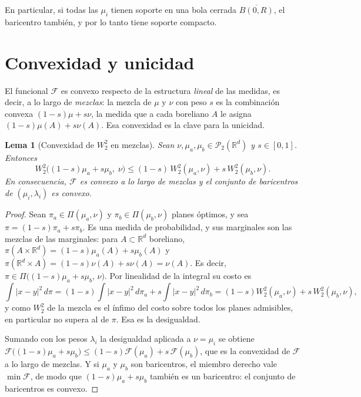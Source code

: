 \documentclass[12pt, a4paper]{amsbook}
\newcommand{\R}{{\mathbb R}}
\newtheorem{lema}[teo]{Lema}
\theoremstyle{remark}
\theoremstyle{definition}
\numberwithin{section}{chapter}
\numberwithin{subsection}{section}
\numberwithin{equation}{section}
\numberwithin{figure}{chapter}
\begin{document}
En particular, si todas las $\mu_i$ tienen soporte en una bola cerrada
$\overline{B(0,R)}$, el baricentro también, y por lo tanto tiene soporte
compacto.

\section{Convexidad y unicidad}\label{sec.bar.unicidad}

El funcional $\mathcal F$ es convexo respecto de la estructura \emph{lineal}
de las medidas, es decir, a lo largo de \emph{mezclas}: la mezcla de $\mu$ y
$\nu$ con peso $s$ es la combinación convexa $(1-s)\mu+s\nu$, la medida que a
cada boreliano $A$ le asigna $(1-s)\mu(A)+s\nu(A)$. Esa convexidad es la
clave para la unicidad.

\begin{lema}[Convexidad de $W_2^2$ en mezclas]\label{lema.W2.convexo}
Sean $\nu,\mu_a,\mu_b\in\mathcal P_2(\R^d)$ y $s\in[0,1]$. Entonces
\[
W_2^2\bigl((1-s)\mu_a+s\mu_b,\;\nu\bigr)\le(1-s)\,W_2^2(\mu_a,\nu)+s\,W_2^2(\mu_b,\nu).
\]
En consecuencia, $\mathcal F$ es convexo a lo largo de mezclas y el conjunto
de baricentros de $(\mu_i,\lambda_i)$ es convexo.
\end{lema}

\begin{proof}
Sean $\pi_a\in\Pi(\mu_a,\nu)$ y $\pi_b\in\Pi(\mu_b,\nu)$ planes óptimos, y
sea $\pi=(1-s)\pi_a+s\pi_b$. Es una medida de probabilidad, y sus marginales
son las mezclas de las marginales: para $A\subset\R^d$ boreliano,
$\pi(A\times\R^d)=(1-s)\mu_a(A)+s\mu_b(A)$ y
$\pi(\R^d\times A)=(1-s)\nu(A)+s\nu(A)=\nu(A)$. Es decir,
$\pi\in\Pi\bigl((1-s)\mu_a+s\mu_b,\,\nu\bigr)$. Por linealidad de la integral
su costo es
\[
\int|x-y|^2\,d\pi=(1-s)\int|x-y|^2\,d\pi_a+s\int|x-y|^2\,d\pi_b
=(1-s)W_2^2(\mu_a,\nu)+s\,W_2^2(\mu_b,\nu),
\]
y como $W_2^2$ de la mezcla es el ínfimo del costo sobre todos los planes
admisibles, en particular no supera al de $\pi$. Esa es la desigualdad.

Sumando con los pesos $\lambda_i$ la desigualdad aplicada a $\nu=\mu_i$ se
obtiene
$\mathcal F\bigl((1-s)\mu_a+s\mu_b\bigr)\le(1-s)\mathcal F(\mu_a)+s\,\mathcal F(\mu_b)$,
que es la convexidad de $\mathcal F$ a lo largo de mezclas. Y si $\mu_a$ y
$\mu_b$ son baricentros, el miembro derecho vale $\min\mathcal F$, de modo
que $(1-s)\mu_a+s\mu_b$ también es un baricentro: el conjunto de baricentros
es convexo.
\end{proof}
\end{document}
